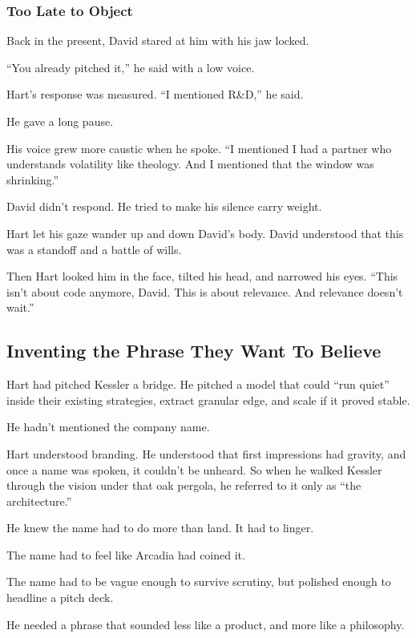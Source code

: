 \medskip

\subsubsection{Too Late to Object}

Back in the present, David stared at him with his jaw locked. 

``You already pitched it,'' he said with a low voice.

Hart’s response was measured. “I mentioned R\&D,” he said. 

He gave a long pause. 

His voice grew more caustic when he spoke. ``I mentioned I had a partner who understands volatility like theology. 
And I mentioned that the window was shrinking.''

David didn’t respond. He tried to make his silence carry weight.

Hart let his gaze wander up and down David's body. 
David understood that this was a standoff and a battle of wills. 

Then Hart looked him in the face, 
tilted his head, and narrowed his eyes. 
``This isn’t about code anymore, David.  This is about relevance. And relevance doesn’t wait.''


\subsection{Inventing the Phrase They Want To Believe}

Hart had pitched Kessler a bridge.
He pitched a model that could ``run quiet'' inside their existing strategies, extract granular edge, and scale 
if it proved stable.

He hadn’t mentioned the company name.

Hart understood branding. He understood that first impressions had gravity, and once a name was spoken, it couldn’t 
be unheard.
So when he walked Kessler through the vision under that oak pergola, he referred to it only as ``the architecture.''

He knew the name had to do more than land. It had to linger.

The name had to feel like Arcadia had coined it.

The name had to be vague enough to survive scrutiny, but polished enough to headline a pitch deck.

He needed a phrase that sounded less like a product, and more like a philosophy.

